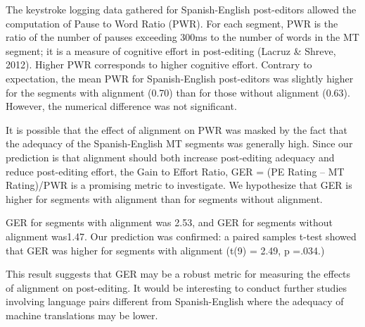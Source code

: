 The keystroke logging data gathered for Spanish-English post-editors allowed the computation of Pause to Word Ratio (PWR). For each segment, PWR is the ratio of the number of pauses exceeding 300ms to the number of words in the MT segment; it is a measure of cognitive effort in post-editing (Lacruz & Shreve, 2012). Higher PWR corresponds to higher cognitive effort.
Contrary to expectation, the mean PWR for Spanish-English post-editors was slightly higher for the segments with alignment (0.70) than for those without alignment (0.63). However, the numerical difference was not significant. 

It is possible that the effect of alignment on PWR was masked by the fact that the adequacy of the Spanish-English MT segments was generally high. Since our prediction is that alignment should both increase post-editing adequacy and reduce post-editing effort, the Gain to Effort Ratio, GER = (PE Rating – MT Rating)/PWR is a promising metric to investigate. We hypothesize that GER is higher for segments with alignment than for segments without alignment. 

GER for segments with alignment was 2.53, and GER for segments without alignment was1.47. Our prediction was confirmed: a paired samples t-test showed that GER was higher for segments with alignment (t(9) = 2.49, p =.034.)

This result suggests that GER may be a robust metric for measuring the effects of alignment on post-editing. It would be interesting to conduct further studies involving language pairs different from Spanish-English where the adequacy of machine translations may be lower.













